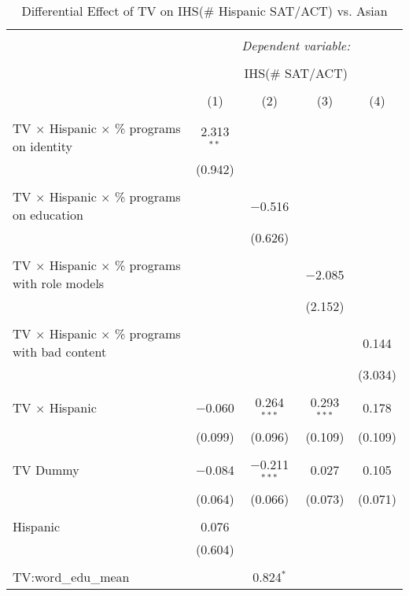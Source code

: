 
\begin{table}[!htbp] \centering 
  \caption{Differential Effect of TV on IHS(\# Hispanic SAT/ACT) vs. Asian} 
  \label{} 
\begin{tabular}{@{\extracolsep{-2pt}}lcccc} 
\\[-1.8ex]\hline 
\hline \\[-1.8ex] 
 & \multicolumn{4}{c}{\textit{Dependent variable:}} \\ 
\cline{2-5} 
\\[-1.8ex] & \multicolumn{4}{c}{IHS(\# SAT/ACT)} \\ 
\\[-1.8ex] & (1) & (2) & (3) & (4)\\ 
\hline \\[-1.8ex] 
 TV $\times$ Hispanic $\times$ \% programs on identity & 2.313$^{**}$ &  &  &  \\ 
  & (0.942) &  &  &  \\ 
  & & & & \\ 
 TV $\times$ Hispanic $\times$ \% programs on education &  & $-$0.516 &  &  \\ 
  &  & (0.626) &  &  \\ 
  & & & & \\ 
 TV $\times$ Hispanic $\times$ \% programs with role models &  &  & $-$2.085 &  \\ 
  &  &  & (2.152) &  \\ 
  & & & & \\ 
 TV $\times$ Hispanic $\times$ \% programs with bad content &  &  &  & 0.144 \\ 
  &  &  &  & (3.034) \\ 
  & & & & \\ 
 TV $\times$ Hispanic & $-$0.060 & 0.264$^{***}$ & 0.293$^{***}$ & 0.178 \\ 
  & (0.099) & (0.096) & (0.109) & (0.109) \\ 
  & & & & \\ 
 TV Dummy & $-$0.084 & $-$0.211$^{***}$ & 0.027 & 0.105 \\ 
  & (0.064) & (0.066) & (0.073) & (0.071) \\ 
  & & & & \\ 
 Hispanic & 0.076 &  &  &  \\ 
  & (0.604) &  &  &  \\ 
  & & & & \\ 
 TV:word\_edu\_mean &  & 0.824$^{*}$ &  &  \\ 

\end{tabular}
\end{table}
